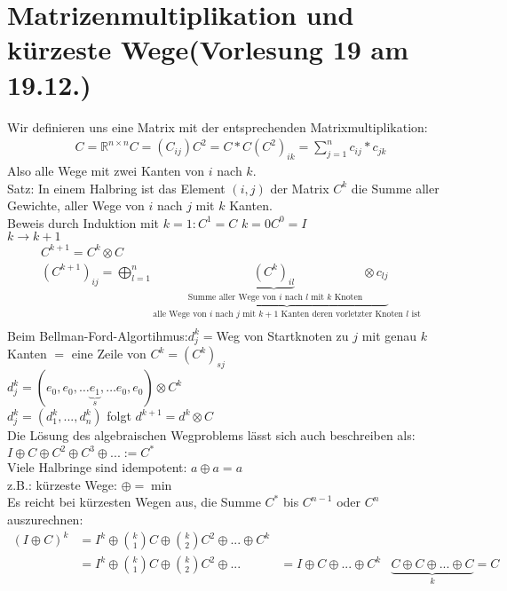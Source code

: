 \section{Matrizenmultiplikation und kürzeste Wege\tiny (Vorlesung 19 am 19.12.)}
Wir definieren uns eine Matrix mit der entsprechenden Matrixmultiplikation:
\begin{align*}
C = \mathbb{R}^{n \times n}
C = (C_{ij})
C^2 = C*C
(C^2)_{ik} = \sum_{j=1}^n  c_{ij}*c_{jk}
\end{align*}
Also alle Wege mit zwei Kanten von $i$ nach $k$.\\
Satz: In einem Halbring ist das Element $(i,j)$ der Matrix $C^k$ die Summe aller Gewichte, aller Wege von $i$ nach $j$ mit $k$ Kanten.\\
Beweis durch Induktion mit $k=1 : C^1 = C$
$k=0 C^0 = I$\\
$k \rightarrow k +1$\\
\begin{align*}
C^{k+1} = C^k \otimes C\\
(C^{k+1})_{ij} = \bigoplus_{l=1}^n \underbrace{ \underbrace{ (C^k)_{il} }_{\text{ Summe aller Wege von $i$ nach $l$ mit $k$ Knoten}}\otimes c_{lj}}_{\text{alle Wege von $i$ nach $j$ mit $k+1$ Kanten deren vorletzter Knoten $l$ ist}}\\
\end{align*}
Beim Bellman-Ford-Algortihmus:$ d_j^k=$Weg von Startknoten zu $j$ mit genau $k$ Kanten $=$ eine Zeile von $C^k = (C^k)_{sj}$\\
$d_j^k=(e_0,e_0,\dots \underbrace{e_1}_{s}, \dots e_0, e_0) \otimes C^k$\\
$d_j^k=(d_1^k,...,d_n^k)$ folgt $d^{k+1} = d^k \otimes C$\\
Die Lösung des algebraischen Wegproblems lässt sich auch beschreiben als:\\
$I \oplus C \oplus C^2 \oplus C^3 \oplus ... := C^*$\\
Viele Halbringe sind idempotent: $a\oplus a = a$\\
z.B.: kürzeste Wege: $\oplus = \min$\\
Es reicht bei kürzesten Wegen aus, die Summe $C^*$ bis $C^{n-1}$ oder $C^n$ auszurechnen:
\begin{align*}
(I\oplus C)^k &= I^k \oplus \binom{k}{1}C \oplus \binom{k}{2}C^2\oplus ... \oplus C^k\\
&= I^k \oplus \binom{k}{1}C \oplus \binom{k}{2}C^2 \oplus ... 
&= I \oplus C \oplus ... \oplus C^k
& \underbrace{C\oplus C \oplus ... \oplus C}_{k} = C\\
\end{align*}
